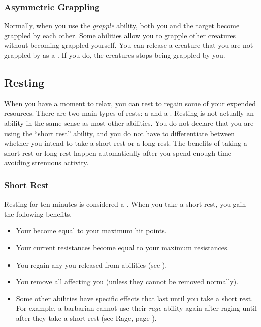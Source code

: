         \subsubsection{Asymmetric Grappling}\label{Asymmetric Grappling}
            Normally, when you use the \textit{grapple} ability, both you and the target become grappled by each other.
            Some abilities allow you to grapple other creatures without becoming grappled yourself.
            You can release a creature that you are not grappled by as a .
            If you do, the creatures stops being grappled by you.

    \subsection{Resting}\label{Resting}
        When you have a moment to relax, you can rest to regain some of your expended resources.
        There are two main types of rests: a  and a .
        Resting is not actually an ability in the same sense as most other abilities.
        You do not declare that you are using the ``short rest'' ability, and you do not have to differentiate between whether you intend to take a short rest or a long rest.
        The benefits of taking a short rest or long rest happen automatically after you spend enough time avoiding strenuous activity.

        \subsubsection{Short Rest}\label{Short Rest}
            Resting for ten minutes is considered a .
            When you take a short rest, you gain the following benefits.
            \begin{itemize}
                \item Your  become equal to your maximum hit points.
                \item Your current resistances become equal to your maximum resistances.
                \item You regain any  you released from  abilities (see ).
                \item You remove all  affecting you (unless they cannot be removed normally).
                \item Some other abilities have specific effects that last until you take a short rest.
                    For example, a barbarian cannot use their \textit{rage} ability again after raging until after they take a short rest (see Rage, page ).
            \end{itemize}

